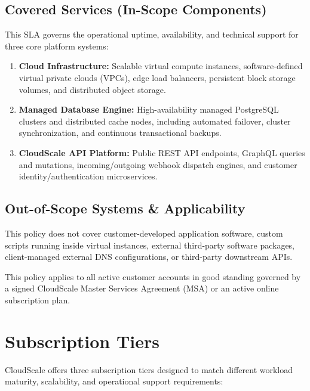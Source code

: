 \documentclass[10pt,letterpaper]{article}
\begin{document}
\subsection{Covered Services (In-Scope Components)}
This SLA governs the operational uptime, availability, and technical support for three core platform systems:
\begin{enumerate}[leftmargin=1.5em, itemsep=0.5pt, topsep=1pt]
  \item \textbf{Cloud Infrastructure:} Scalable virtual compute instances, software-defined virtual private clouds (VPCs), edge load balancers, persistent block storage volumes, and distributed object storage.
  \item \textbf{Managed Database Engine:} High-availability managed PostgreSQL clusters and distributed cache nodes, including automated failover, cluster synchronization, and continuous transactional backups.
  \item \textbf{CloudScale API Platform:} Public REST API endpoints, GraphQL queries and mutations, incoming/outgoing webhook dispatch engines, and customer identity/authentication microservices.
\end{enumerate}

\subsection{Out-of-Scope Systems \& Applicability}
This policy does not cover customer-developed application software, custom scripts running inside virtual instances, external third-party software packages, client-managed external DNS configurations, or third-party downstream APIs.

This policy applies to all active customer accounts in good standing governed by a signed CloudScale Master Services Agreement (MSA) or an active online subscription plan.

\section{Subscription Tiers}
CloudScale offers three subscription tiers designed to match different workload maturity, scalability, and operational support requirements:
\end{document}
